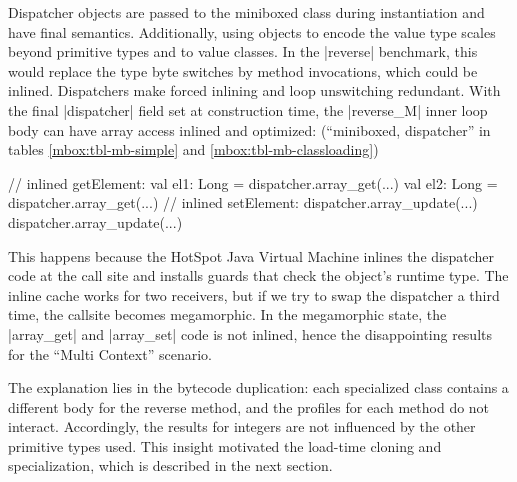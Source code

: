 Dispatcher objects are passed to the miniboxed class during instantiation and have final semantics. Additionally, using objects to encode the value type scales beyond primitive types and to value classes. In the |reverse| benchmark, this would replace the type byte switches by method invocations, which could be inlined. Dispatchers make forced inlining and loop unswitching redundant. With the final |dispatcher| field set at construction time, the |reverse_M| inner loop body can have array access inlined and optimized: (``miniboxed,  dispatcher'' in tables \ref{mbox:tbl-mb-simple} and \ref{mbox:tbl-mb-classloading})

\begin{lstlisting-nobreak}
 // inlined getElement:
 val el1: Long = dispatcher.array_get(...)
 val el2: Long = dispatcher.array_get(...)
 // inlined setElement:
 dispatcher.array_update(...)
 dispatcher.array_update(...)
\end{lstlisting-nobreak}

 This happens because the HotSpot Java Virtual Machine inlines the dispatcher code at the call site and installs guards that check the object's runtime type. The inline cache works for two receivers, but if we try to swap the dispatcher a third time, the callsite becomes megamorphic. In the megamorphic state, the |array_get| and |array_set| code is not inlined, hence the disappointing results for the ``Multi Context'' scenario.

 The explanation lies in the bytecode duplication: each specialized class contains a different body for the reverse method, and the profiles for each method do not interact. Accordingly, the results for integers are not influenced by the other primitive types used. This insight motivated the load-time cloning and specialization, which is described in the next section.
